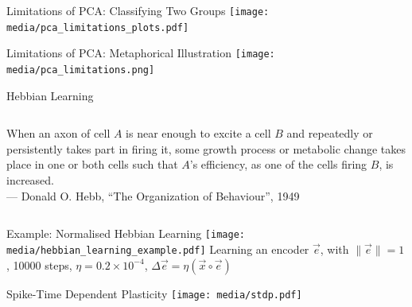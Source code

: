 \documentclass[handout,aspectratio=169]{beamer}
\begin{document}
	\begin{frame}{Limitations of PCA: Classifying Two Groups}
		\centering
		\texttt{[image: media/pca\_limitations\_plots.pdf]}
	\end{frame}

	\begin{frame}{Limitations of PCA: Metaphorical Illustration}
		\centering
		\vspace{0.25cm}
		\texttt{[image: media/pca\_limitations.png]}\\[0.25cm]
	\end{frame}

	\begin{frame}{Hebbian Learning}
		\begin{columns}
			{\large\justify\quotefont When an axon of cell $A$ is near enough to excite a cell $B$ and repeatedly or persistently takes part in firing it, some growth process or metabolic change takes place in one or both cells such that $A$'s efficiency, as one of the cells firing $B$, is increased.\\[0.25cm]\raggedleft\color{aluminium4} --- Donald O. Hebb, \enquote{The Organization of Behaviour}, 1949\\}
		\end{columns}
	\end{frame}

	\begin{frame}{Example: Normalised Hebbian Learning}
		\centering
		\texttt{[image: media/hebbian\_learning\_example.pdf]}
		Learning an encoder $\vec e$, with $\| \vec e \| = 1$, 10000 steps, $\eta = 0.2 \times 10^{-4}$, $\Delta \vec e = \eta (\vec x \circ \vec e)$
	\end{frame}

	\begin{frame}{Spike-Time Dependent Plasticity}
        \centering
		\texttt{[image: media/stdp.pdf]}
	\end{frame}
\end{document}
